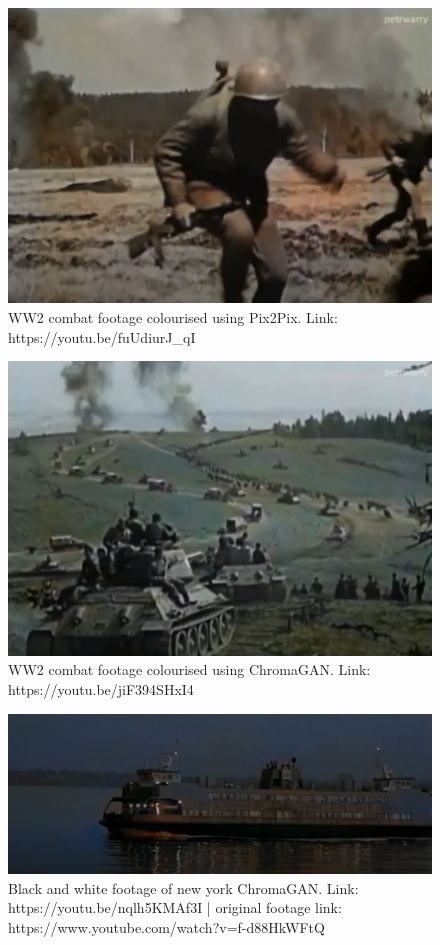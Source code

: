 \begin{figure}[H]
    \centering
    \includegraphics[width=1\columnwidth]{sections/appendix/ww2_colourisation3.JPG}
    \caption{WW2 combat footage colourised using Pix2Pix. Link: https://youtu.be/fuUdiurJ_qI}
    \label{fig:my_label}
\end{figure}

\begin{figure}[H]
    \centering
    \includegraphics[width=1\columnwidth]{sections/appendix/ww2_colourisation4.JPG}
    \caption{WW2 combat footage colourised using ChromaGAN. Link: https://youtu.be/jiF394SHxI4}
    \label{fig:my_label}
\end{figure}


\begin{figure}[H]
    \centering
    \includegraphics[width=1\columnwidth]{sections/appendix/new_york_colourisation.JPG}
    \caption{Black and white footage of new york ChromaGAN. Link:  https://youtu.be/nqlh5KMAf3I | original footage link: https://www.youtube.com/watch?v=f-d88HkWFtQ}
    \label{fig:my_label}
\end{figure}